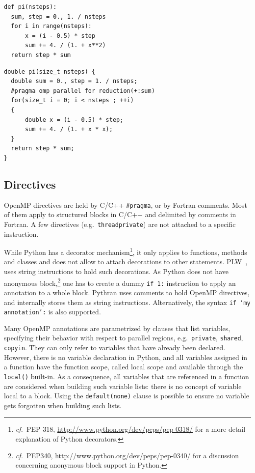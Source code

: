 \documentclass[conference]{IEEEtran}
\newcommand\see{\emph{cf.\ }}
\begin{document}
\begin{lstlisting}[float, label={lst:motivating-example}, caption={Motivating
example: computing $\pi$ in Python.}]
def pi(nsteps):
  sum, step = 0., 1. / nsteps
  for i in range(nsteps):
      x = (i - 0.5) * step
      sum += 4. / (1. + x**2)
  return step * sum
\end{lstlisting}

\begin{lstlisting}[float, label={lst:motivating-example-c}, caption={Motivating
example: computing $\pi$ in C with OpenMP.}]
double pi(size_t nsteps) {
  double sum = 0., step = 1. / nsteps;
  #pragma omp parallel for reduction(+:sum)
  for(size_t i = 0; i < nsteps ; ++i)
  {
      double x = (i - 0.5) * step;
      sum += 4. / (1. + x * x);
  }
  return step * sum;
}
\end{lstlisting}


\subsection{Directives}

OpenMP directives are held by C/C++ \texttt{\#pragma}, or by Fortran comments.
Most of them apply to structured blocks in C/C++ and delimited by comments in
Fortran. A few directives (e.g.\ \texttt{threadprivate}) are not attached to a
specific instruction.

While Python has a decorator mechanism\footnote{\see PEP 318,
\url{http://www.python.org/dev/peps/pep-0318/} for a more detail explanation of
Python decorators.}, it only applies to functions, methods and classes and does
not allow to attach decorations to other statements.
PLW~\cite{dongara2007}, uses string instructions to hold such decorations. As
Python does not have anonymous block,\footnote{\see PEP340,
    \url{http://www.python.org/dev/peps/pep-0340/} for a discussion concerning
anonymous block support in Python.} one has to create a dummy \texttt{if 1:}
instruction to apply an annotation to a whole block. Pythran uses comments to
hold OpenMP directives, and internally stores them as string instructions.
Alternatively, the syntax \texttt{if 'my annotation':} is also supported.

Many OpenMP annotations are parametrized by clauses that list variables,
specifying their behavior with respect to parallel regions,
e.g.\ \texttt{private}, \texttt{shared}, \texttt{copyin}. They can only refer to
variables that have already been declared. However, there is no variable
declaration in Python, and all variables assigned in a function have the
function scope, called local scope and available through the \texttt{local()}
built-in. As a consequence, all variables that are referenced in a function are
considered when building such variable lists: there is no concept of variable
local to a block. Using the \texttt{default(none)} clause is possible to ensure
no variable gets forgotten when building such lists.
\end{document}
